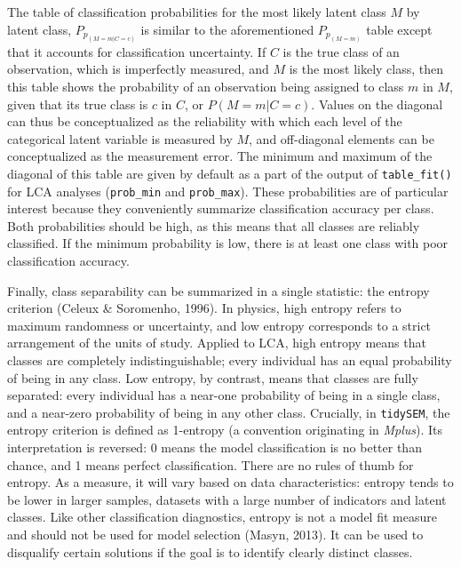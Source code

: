 \documentclass[
  ,man,floatsintext]{apa6}
\begin{document}
The table of classification probabilities for the most likely latent class \(M\) by latent class,
\(P_{p_{(M = m | C = c)}}\) is similar to the aforementioned \(P_{p_{(M = m)}}\) table
except that it accounts for classification uncertainty.
If \(C\) is the true class of an observation, which is imperfectly measured,
and \(M\) is the most likely class,
then this table shows the probability of an observation being assigned to class \(m\) in \(M\), given that its true class is \(c\) in \(C\), or \(P(M=m|C=c)\).
Values on the diagonal can thus be conceptualized as the reliability with which each level of the categorical latent variable is measured by \(M\),
and off-diagonal elements can be conceptualized as the measurement error.
The minimum and maximum of the diagonal of this table are given by default as a part of the output of \texttt{table\_fit()} for LCA analyses (\texttt{prob\_min} and \texttt{prob\_max}).
These probabilities are of particular interest because they conveniently summarize classification accuracy per class.
Both probabilities should be high, as this means that all classes are reliably classified.
If the minimum probability is low,
there is at least one class with poor classification accuracy.

Finally, class separability can be summarized in a single statistic:
the entropy criterion (Celeux \& Soromenho, 1996).
In physics, high entropy refers to maximum randomness or uncertainty,
and low entropy corresponds to a strict arrangement of the units of study.
Applied to LCA, high entropy means that classes are completely indistinguishable;
every individual has an equal probability of being in any class.
Low entropy, by contrast, means that classes are fully separated: every individual has a near-one probability of being in a single class, and a near-zero probability of being in any other class.
Crucially, in \texttt{tidySEM}, the entropy criterion is defined as 1-entropy (a convention originating in \emph{Mplus}).
Its interpretation is reversed:
0 means the model classification is no better than chance,
and 1 means perfect classification.
There are no rules of thumb for entropy. As a measure, it will vary based on data characteristics:
entropy tends to be lower in larger samples, datasets with a large number of indicators and latent classes.
Like other classification diagnostics,
entropy is not a model fit measure and should not be used for model selection (Masyn, 2013).
It can be used to disqualify certain solutions if the goal is to identify clearly distinct classes.
\end{document}
